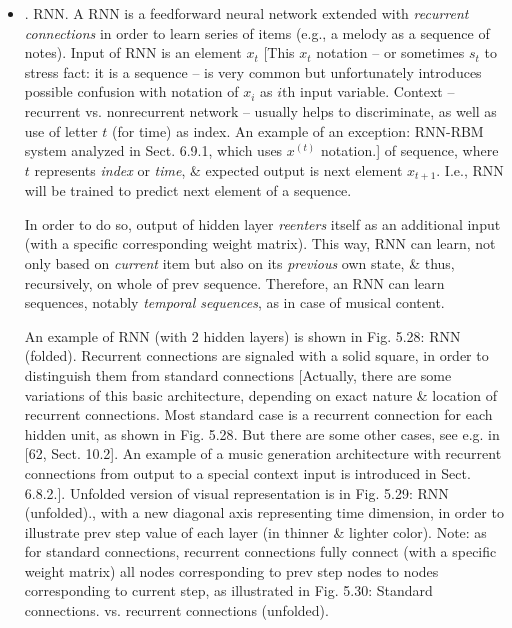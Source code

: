 \documentclass{article}
\begin{document}
\begin{itemize}
\begin{itemize}
\begin{itemize}
		\end{itemize}
		\item {. RNN.} A RNN is a feedforward neural network extended with {\it recurrent connections} in order to learn series of items (e.g., a melody as a sequence of notes). Input of RNN is an element $x_t$ [This $x_t$ notation -- or sometimes $s_t$ to stress fact: it is a sequence -- is very common but unfortunately introduces possible confusion with notation of $x_i$ as $i$th input variable. Context -- recurrent vs. nonrecurrent network -- usually helps to discriminate, as well as use of letter $t$ (for time) as index. An example of an exception: RNN-RBM system analyzed in Sect. 6.9.1, which uses $x^{(t)}$ notation.] of sequence, where $t$ represents {\it index} or {\it time}, \& expected output is next element $x_{t+1}$. I.e., RNN will be trained to predict next element of a sequence.

		In order to do so, output of hidden layer {\it reenters} itself as an additional input (with a specific corresponding weight matrix). This way, RNN can learn, not only based on {\it current} item but also on its {\it previous} own state, \& thus, recursively, on whole of prev sequence. Therefore, an RNN can learn sequences, notably {\it temporal sequences}, as in case of musical content.

		An example of RNN (with 2 hidden layers) is shown in {\sf Fig. 5.28: RNN (folded).} Recurrent connections are signaled with a solid square, in order to distinguish them from standard connections [Actually, there are some variations of this basic architecture, depending on exact nature \& location of recurrent connections. Most standard case is a recurrent connection for each hidden unit, as shown in {\sf Fig. 5.28}. But there are some other cases, see e.g. in [62, Sect. 10.2]. An example of a music generation architecture with recurrent connections from output to a special context input is introduced in Sect. 6.8.2.]. Unfolded version of visual representation is in {\sf Fig. 5.29: RNN (unfolded).}, with a new diagonal axis representing time dimension, in order to illustrate prev step value of each layer (in thinner \& lighter color). Note: as for standard connections, recurrent connections fully connect (with a specific weight matrix) all nodes corresponding to prev step nodes to nodes corresponding to current step, as illustrated in {\sf Fig. 5.30: Standard connections. vs. recurrent connections (unfolded).}


\end{itemize}
\end{itemize}
\end{document}
